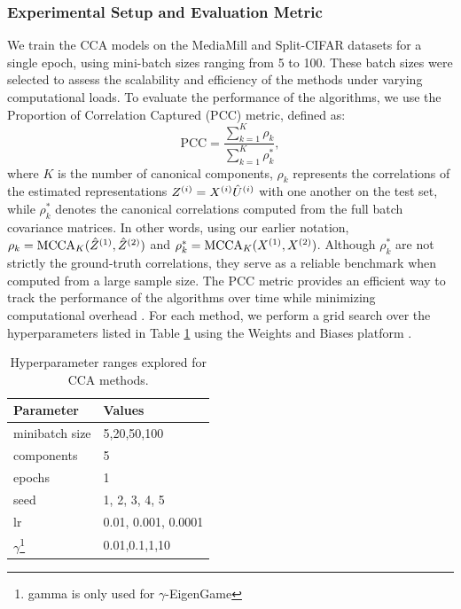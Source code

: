 \subsubsection{Experimental Setup and Evaluation Metric}
We train the CCA models on the MediaMill and Split-CIFAR datasets for a single epoch, using mini-batch sizes ranging from 5 to 100. These batch sizes were selected to assess the scalability and efficiency of the methods under varying computational loads.
To evaluate the performance of the algorithms, we use the Proportion of Correlation Captured (PCC) metric, defined as:
\begin{equation}
\text{PCC} = \frac{\sum_{k=1}^K \rho_k}{\sum_{k=1}^K \rho_k^*},
\end{equation}
where $K$ is the number of canonical components, $\rho_k$ represents the correlations of the estimated representations $Z^{(i)}=X^{(i)}\hat{U}^{(i)}$ with one another on the test set, while $\rho_k^*$ denotes the canonical correlations computed from the full batch covariance matrices.
In other words, using our earlier notation, $\rho_k = \operatorname{MCCA}_K(\hat{Z}^{(1)}, \hat{Z}^{(2)})$ and $\rho_k^* = \operatorname{MCCA}_K(X^{(1)}, X^{(2)})$.
Although $\rho_k^*$ are not strictly the ground-truth correlations, they serve as a reliable benchmark when computed from a large sample size. The PCC metric provides an efficient way to track the performance of the algorithms over time while minimizing computational overhead \citep{meng2021online, gemp2022generalized, ma2015finding, ge2016efficient}.
For each method, we perform a grid search over the hyperparameters listed in Table \ref{tab:hyperparameters} using the Weights and Biases platform \citep{wandb}.
\begin{table}[h!]
    \centering
    \begin{tabular}{|l|l|}
        \hline Parameter             & Values              \\
        \hline minibatch size        & 5,20,50,100         \\
        \hline components            & 5                   \\
        \hline epochs                & 1                   \\
        \hline seed                  & 1, 2, 3, 4, 5       \\
        \hline lr                    & 0.01, 0.001, 0.0001 \\
        \hline $\gamma$\footnote{gamma is only used for $\gamma$-EigenGame} & 0.01,0.1,1,10       \\
        \hline
    \end{tabular}
    \caption{Hyperparameter ranges explored for CCA methods.} 
    \label{tab:hyperparameters}
\end{table}
